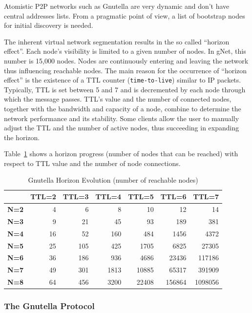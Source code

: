 Atomistic P2P networks such as Gnutella are very dynamic and don't have central
addresses lists. From a pragmatic point of view, a list of bootstrap nodes for
initial discovery is needed.

The inherent virtual network segmentation results in the so called ``horizon
effect''. Each node's visibility is limited to a given number of nodes. In
gNet, this number is 15,000 nodes. Nodes are continuously entering and leaving
the network thus influencing reachable nodes. The main reason for the
occurrence of ``horizon effect'' is the existence of a TTL counter
(\texttt{time-to-live}) similar to IP packets. Typically, TTL is set between 5
and 7 and is decremented by each node through which the message passes. TTL's
value and the number of connected nodes, together with the bandwidth and
capacity of a node, combine to determine the network performance and its
stability. Some clients allow the user to manually adjust the TTL and the
number of active nodes, thus succeeding in expanding the horizon.

Table~\ref{tab:p2p-systems:gnutella-horizon} shows a horizon progress
(number of nodes that can be reached) with respect to TTL value and the number
of node connections.

\begin{table}[htb]
  \centering
  \caption{Gnutella Horizon Evolution (number of reachable nodes)}
  \label{tab:p2p-systems:gnutella-horizon}
  \begin{tabular}{@{}lrrrrrr@{}}
    \toprule
      & \textbf{TTL=2} & \textbf{TTL=3} & \textbf{TTL=4} & \textbf{TTL=5} &
      \textbf{TTL=6} & \textbf{TTL=7} \\
    \midrule
      \textbf{N=2} & 4 & 6 & 8 & 10 & 12 & 14 \\
      \textbf{N=3} & 9 & 21 & 45 & 93 & 189 & 381 \\
      \textbf{N=4} & 16 & 52 & 160 & 484 & 1456 & 4372 \\
      \textbf{N=5} & 25 & 105 & 425 & 1705 & 6825 & 27305 \\
      \textbf{N=6} & 36 & 186 & 936 & 4686 & 23436 & 117186 \\
      \textbf{N=7} & 49 & 301 & 1813 & 10885 & 65317 & 391909 \\
      \textbf{N=8} & 64 & 456 & 3200 & 22408 & 156864 & 1098056 \\
    \bottomrule
  \end{tabular}
\end{table}

\subsubsection{The Gnutella Protocol}

